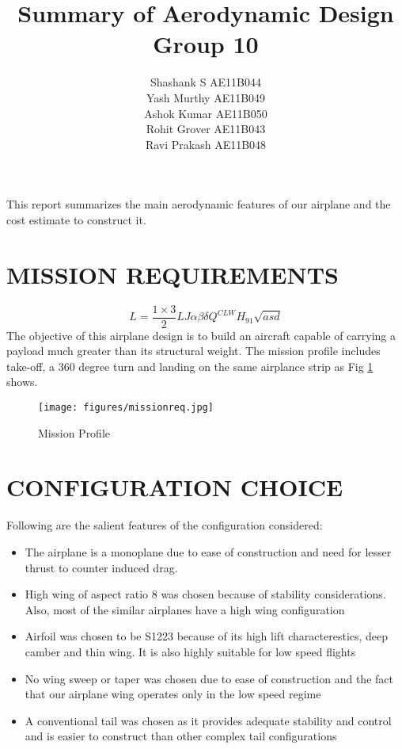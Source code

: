 \documentclass[a4paper,10pt]{article}
\title{Summary of Aerodynamic Design\\Group 10}
\author{Shashank S AE11B044\\Yash Murthy AE11B049\\Ashok Kumar AE11B050\\Rohit Grover AE11B043\\Ravi Prakash AE11B048}
\date{}
\begin{document}
\maketitle
This report summarizes the main aerodynamic features of our airplane and the cost estimate to construct it.

\section{MISSION REQUIREMENTS}
\label{s:ch1_intro}

\begin{equation} L = \frac{1\times3}{2}LJ\alpha\beta\delta Q^{CLW}H_{91}\sqrt{asd} \end{equation}
The objective of this airplane design is to build an aircraft capable of carrying a payload much greater than its structural weight. The mission profile includes take-off, a 360 degree turn and landing on the same airplance strip as Fig \ref{fig:mission_req} shows.
\begin{figure}[H]
    \begin{center}
      \texttt{[image: figures/missionreq.jpg]}
\caption{Mission Profile}
       \label{fig:mission_req}
    \end{center}
\end{figure}

\section{CONFIGURATION CHOICE}
Following are the salient features of the configuration considered:
\begin{itemize}
\item The airplane is a monoplane due to ease of construction and need for lesser thrust to counter induced drag.
\item High wing of aspect ratio 8 was chosen because of stability considerations. Also, most of the similar airplanes have a high wing configuration
\item Airfoil was chosen to be S1223 because of its high lift characterestics, deep camber and thin wing. It is also highly suitable for low speed flights
\item No wing sweep or taper was chosen due to ease of construction and the fact that our airplane wing operates only in the low speed regime
\item A conventional tail was chosen as it provides adequate stability and control and is easier to construct than other complex tail configurations

\end{itemize}
 
\end{document}
